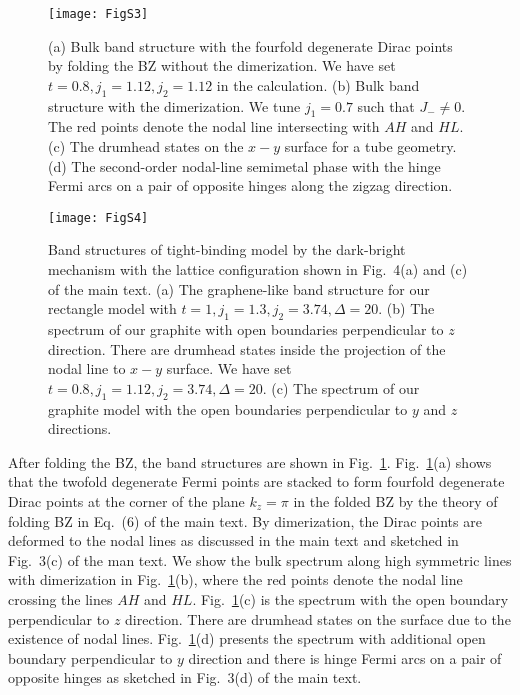 \documentclass[aps,prl,twocolumn,noshowpacs,superscriptaddress]{revtex4-1}
\begin{document}
\begin{figure}[t]
	\centering
	\texttt{[image: FigS3]}
	\caption{  (a) Bulk band structure with the fourfold degenerate Dirac points by folding the BZ without the dimerization. We have set $t=0.8,j_1=1.12,j_2=1.12$ in the calculation. (b) Bulk band structure with the dimerization. We tune $j_1=0.7$ such that $J_-\neq0$. The red points denote the nodal line intersecting with $ AH $ and $ HL $. (c) The drumhead states on the $ x-y $ surface for a tube geometry. (d) The second-order nodal-line semimetal phase with the hinge Fermi arcs on a pair of opposite hinges along the zigzag direction.}
	\label{figs4}
\end{figure}


\begin{figure}[t]
	\centering
	\texttt{[image: FigS4]}
	\caption{Band structures of tight-binding model by the dark-bright mechanism with the lattice configuration shown in Fig.~4(a) and (c) of the main text. (a) The graphene-like band structure for our rectangle model with $t=1,j_1=1.3,j_2=3.74,\Delta=20$. (b) The spectrum of our graphite with open boundaries perpendicular to $ z $ direction. There are drumhead states inside the projection of the nodal line to $ x-y $ surface. We have set $t=0.8,j_1=1.12,j_2=3.74,\Delta=20$. (c) The spectrum of our graphite model with the open boundaries perpendicular to $ y $ and $ z $ directions.}
	\label{figs5}
\end{figure}


After folding the BZ, the band structures are shown in Fig.~\ref{figs4}. Fig.~\ref{figs4}(a) shows that the twofold degenerate Fermi points are stacked to form fourfold degenerate Dirac points at the corner of the plane $ k_z=\pi $ in the folded BZ by the theory of folding BZ in Eq.~(6) of the main text. By dimerization, the Dirac points are deformed to the nodal lines as discussed in the main text and sketched in Fig.~3(c) of the man text. We show the bulk spectrum along high symmetric lines with dimerization in Fig.~\ref{figs4}(b), where the red points denote the nodal line crossing the lines $ AH $ and $ HL $. Fig.~\ref{figs4}(c) is the spectrum with the open boundary perpendicular to $ z $ direction. There are drumhead states on the surface due to the existence of nodal lines. Fig.~\ref{figs4}(d) presents the spectrum with additional open boundary perpendicular to $ y $ direction and there is hinge Fermi arcs on a pair of opposite hinges as sketched in Fig.~3(d) of the main text.
\end{document}
